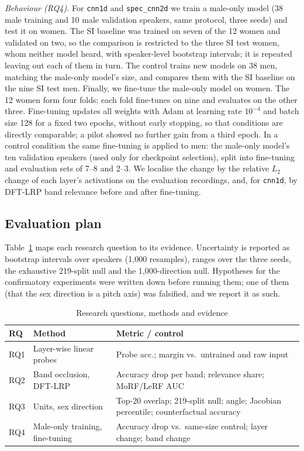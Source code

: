 \documentclass[conference]{IEEEtran}
\begin{document}
\emph{Behaviour (RQ4).} For \texttt{cnn1d} and \texttt{spec\_cnn2d} we train
a male-only model (38 male training and 10 male validation speakers, same
protocol, three seeds) and test it on women. The SI baseline was trained on
seven of the 12 women and validated on two, so the comparison is restricted to
the three SI test women, whom neither model heard, with speaker-level
bootstrap intervals; it is repeated leaving out each of them in turn. The
control trains new models on 38 men, matching the male-only model's size, and
compares them with the SI baseline on the nine SI test men. Finally, we
fine-tune the male-only model on women. The 12 women form four folds; each
fold fine-tunes on nine and evaluates on the other three. Fine-tuning updates
all weights with Adam at learning rate $10^{-4}$ and batch size 128 for a
fixed two epochs, without early stopping, so that conditions are directly
comparable; a pilot showed no further gain from a third epoch. In a control
condition the same fine-tuning is applied to men: the male-only model's ten
validation speakers (used only for checkpoint selection), split into
fine-tuning and evaluation sets of 7--8 and 2--3. We localise the change by
the relative $L_2$ change of each layer's activations on the evaluation
recordings, and, for \texttt{cnn1d}, by DFT-LRP band relevance before and
after fine-tuning.

\subsection{Evaluation plan}
Table~\ref{tab:rqmap} maps each research question to its evidence.
Uncertainty is reported as bootstrap intervals over speakers (1{,}000
resamples), ranges over
the three seeds, the exhaustive 219-split null and the 1{,}000-direction
null. Hypotheses for the confirmatory experiments were written down before
running them; one of them (that the sex direction is a pitch axis) was
falsified, and we report it as such.

\begin{table}[t]
\caption{Research questions, methods and evidence}
\label{tab:rqmap}
\centering\footnotesize
\begin{tabular}{@{}lp{2.6cm}p{3.6cm}@{}}
\toprule
RQ & Method & Metric / control \\
\midrule
RQ1 & Layer-wise linear probes & Probe acc.; margin vs.\ untrained and raw input \\
RQ2 & Band occlusion, DFT-LRP & Accuracy drop per band; relevance share; MoRF/LeRF AUC \\
RQ3 & Units, sex direction & Top-20 overlap; 219-split null; angle; Jacobian percentile; counterfactual accuracy \\
RQ4 & Male-only training, fine-tuning & Accuracy drop vs.\ same-size control; layer change; band change \\
\bottomrule
\end{tabular}
\end{table}
\end{document}
